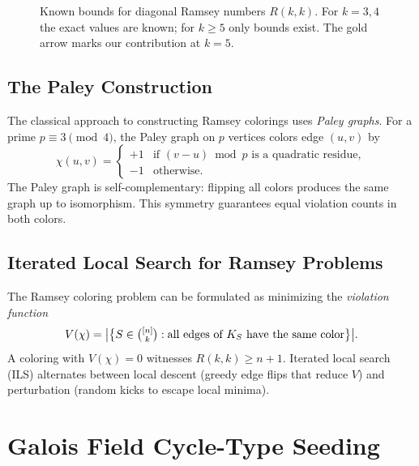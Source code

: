 \documentclass[11pt,a4paper]{article}
\theoremstyle{plain}
\theoremstyle{remark}
\begin{document}
\begin{figure}[H]
\caption{Known bounds for diagonal Ramsey numbers $R(k,k)$.
  For $k=3,4$ the exact values are known; for $k \geq 5$ only
  bounds exist. The gold arrow marks our contribution at $k=5$.}
\label{fig:ramsey-bounds}
\end{figure}

\subsection{The Paley Construction}

The classical approach to constructing Ramsey colorings uses
\emph{Paley graphs}. For a prime $p \equiv 3 \pmod{4}$, the
Paley graph on $p$ vertices colors edge $(u,v)$ by
\[
  \chi(u,v) = \begin{cases}
    +1 & \text{if } (v - u) \bmod p \text{ is a quadratic residue}, \\
    -1 & \text{otherwise.}
  \end{cases}
\]
The Paley graph is self-complementary: flipping all colors produces
the same graph up to isomorphism. This symmetry guarantees equal
violation counts in both colors.

\subsection{Iterated Local Search for Ramsey Problems}

The Ramsey coloring problem can be formulated as minimizing the
\emph{violation function}
\[
  V(\chi) = \bigl|\bigl\{S \in \tbinom{[n]}{k} :
    \text{all edges of } K_S \text{ have the same color}\bigr\}\bigr|.
\]
A coloring with $V(\chi) = 0$ witnesses $R(k,k) \geq n+1$.
Iterated local search (ILS) alternates between local descent
(greedy edge flips that reduce $V$) and perturbation (random
kicks to escape local minima).

\section{Galois Field Cycle-Type Seeding}
\end{document}
